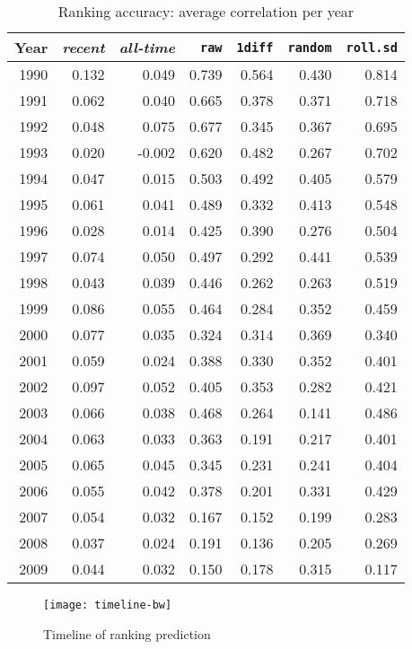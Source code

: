 \documentclass{article}\usepackage[]{graphicx}\usepackage[]{color}
\newcommand{\naive}{\textit{recent}}
\newcommand{\default}{\textit{all-time}}
\newcommand{\raw}{\texttt{raw}}
\newcommand{\diff}{\texttt{1diff}}
\newcommand{\random}{\texttt{random}}
\newcommand{\rollsd}{\texttt{roll.sd}}
\newcommand{\ra}[1]{\renewcommand{\arraystretch}{#1}}
\begin{document}
\begin{table}
\ra{1.2}
\caption{Ranking accuracy: average correlation per year}
\label{stat:acc:time}
\begin{center}
\begin{tabular}{rrrrrrr}
  \toprule
 Year & \naive{} & \default{} & \raw{} & \diff{} & \random{} & \rollsd{} \\ 
  \midrule
1990 & 0.132 & 0.049 & 0.739 & 0.564 & 0.430 & 0.814 \\ 
  1991 & 0.062 & 0.040 & 0.665 & 0.378 & 0.371 & 0.718 \\ 
  1992 & 0.048 & 0.075 & 0.677 & 0.345 & 0.367 & 0.695 \\ 
  1993 & 0.020 & -0.002 & 0.620 & 0.482 & 0.267 & 0.702 \\ 
  1994 & 0.047 & 0.015 & 0.503 & 0.492 & 0.405 & 0.579 \\ 
  1995 & 0.061 & 0.041 & 0.489 & 0.332 & 0.413 & 0.548 \\ 
  1996 & 0.028 & 0.014 & 0.425 & 0.390 & 0.276 & 0.504 \\ 
  1997 & 0.074 & 0.050 & 0.497 & 0.292 & 0.441 & 0.539 \\ 
  1998 & 0.043 & 0.039 & 0.446 & 0.262 & 0.263 & 0.519 \\ 
  1999 & 0.086 & 0.055 & 0.464 & 0.284 & 0.352 & 0.459 \\ 
  2000 & 0.077 & 0.035 & 0.324 & 0.314 & 0.369 & 0.340 \\ 
  2001 & 0.059 & 0.024 & 0.388 & 0.330 & 0.352 & 0.401 \\ 
  2002 & 0.097 & 0.052 & 0.405 & 0.353 & 0.282 & 0.421 \\ 
  2003 & 0.066 & 0.038 & 0.468 & 0.264 & 0.141 & 0.486 \\ 
  2004 & 0.063 & 0.033 & 0.363 & 0.191 & 0.217 & 0.401 \\ 
  2005 & 0.065 & 0.045 & 0.345 & 0.231 & 0.241 & 0.404 \\ 
  2006 & 0.055 & 0.042 & 0.378 & 0.201 & 0.331 & 0.429 \\ 
  2007 & 0.054 & 0.032 & 0.167 & 0.152 & 0.199 & 0.283 \\ 
  2008 & 0.037 & 0.024 & 0.191 & 0.136 & 0.205 & 0.269 \\ 
  2009 & 0.044 & 0.032 & 0.150 & 0.178 & 0.315 & 0.117 \\ 
   \bottomrule
\end{tabular}
\end{center}
\end{table}

\clearpage

\begin{sidewaysfigure}
\texttt{[image: timeline-bw]}
 \caption{Timeline of ranking prediction} 
\label{fig: timeline} 
\end{sidewaysfigure}
\end{document}
